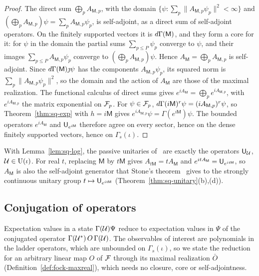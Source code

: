 \begin{vetdenv}
\begin{proof}
The direct sum $\bigoplus_pA_{\mathsf M,p}$, with the domain $\{\psi:\sum_p\lVert A_{\mathsf M,p}\psi_p\rVert^2<\infty\}$ and
$(\bigoplus_pA_{\mathsf M,p})\psi=\sum_pA_{\mathsf M,p}\psi_p$, is self-adjoint, as a direct sum of self-adjoint
operators. On the finitely supported vectors it is $d\Gamma(\mathsf M)$, and they form a core for it: for $\psi$ in the
domain the partial sums $\sum_{p\le P}\psi_p$ converge to $\psi$, and their images $\sum_{p\le P}A_{\mathsf M,p}\psi_p$
converge to $(\bigoplus_pA_{\mathsf M,p})\psi$. Hence $A_{\mathsf M}=\bigoplus_pA_{\mathsf M,p}$ is self-adjoint. Since
$d\Gamma(\mathsf M)\jmath\psi$ has the components $A_{\mathsf M,p}\psi_p$, its squared norm is
$\sum_p\lVert A_{\mathsf M,p}\psi_p\rVert^2$, so the domain and the action of $A_{\mathsf M}$ are those of the maximal
realization. The functional calculus of direct sums gives $e^{iA_{\mathsf M}}=\bigoplus_pe^{iA_{\mathsf M,p}}$, with
$e^{iA_{\mathsf M,p}}$ the matrix exponential on $\mathcal F_p$. For $\psi\in\mathcal F_p$, $d\Gamma(i\mathsf M)^r\psi=(iA_{\mathsf M,p})^r\psi$,
so Theorem~\ref{thm:sq-exp} with $h=i\mathsf M$ gives $e^{iA_{\mathsf M,p}}\psi=\Gamma(e^{i\mathsf M})\psi$. The bounded
operators $e^{iA_{\mathsf M}}$ and $\mathsf U_{e^{i\mathsf M}}$ therefore agree on every sector, hence on the dense finitely
supported vectors, hence on $\Gamma_s(\iota)$.
\end{proof}

With Lemma~\ref{lem:sq-log}, the passive unitaries of~\cite[(12)]{tjoacirac} are exactly the operators $\mathsf U_\mathcal U$,
$\mathcal U\in\mathrm U(\iota)$. For real $t$, replacing $\mathsf M$ by $t\mathsf M$ gives $A_{t\mathsf M}=tA_{\mathsf M}$ and
$e^{itA_{\mathsf M}}=\mathsf U_{e^{it\mathsf M}}$, so $A_{\mathsf M}$ is also the self-adjoint generator that Stone's
theorem~\cite[]{rs1} gives to the strongly continuous unitary group $t\mapsto\mathsf U_{e^{it\mathsf M}}$
(Theorem~\ref{thm:sq-unitary}(b),(d)).

\subsection{Conjugation of operators}

Expectation values in a state $\Gamma(\mathcal U)\Psi$ reduce to expectation values in $\Psi$ of the conjugated operator
$\Gamma(\mathcal U^*)\,O\,\Gamma(\mathcal U)$. The observables of interest are polynomials in the ladder operators, which are
unbounded on $\Gamma_s(\iota)$, so we state the reduction for an arbitrary linear map $O$ of $\mathcal F$ through its maximal
realization $\bar O$ (Definition~\ref{def:fock-maxreal}), which needs no closure, core or self-adjointness.


\end{vetdenv}
